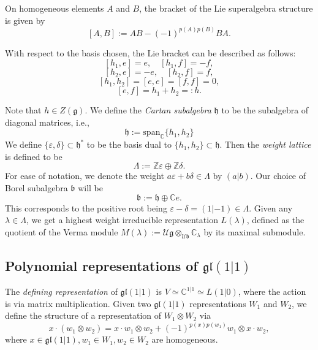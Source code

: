 \documentclass[11pt,a4paper,reqno]{amsart}
\newcommand{\g}{\mathfrak{g}}
\newcommand{\gl}{\mathfrak{gl}}
\newcommand{\e}{\varepsilon}
\newcommand{\C}{\mathbb{C}}
\newcommand{\Z}{\mathbb{Z}}
\renewcommand{\d}{\delta}
\newcommand{\h}{\mathfrak{h}}
\renewcommand{\sl}{\mathfrak{sl}}
\numberwithin{equation}{section}
\theoremstyle{definition}
\theoremstyle{remark}
\begin{document}
On homogeneous elements $A$ and $B$, the bracket of the Lie superalgebra structure is given by
\[[A, B] := AB - (-1)^{p(A)p(B)} BA.\]

With respect to the basis chosen, the Lie bracket can be described as follows:
\[[h_1, e] = e,\quad [h_1, f] = -f,\]
\[[h_2, e] = -e,\quad [h_2, f] = f,\]
\[[h_1, h_2] = [e,e] = [f,f] = 0,\]
\[[e, f] = h_1+h_2 =: h.\]

Note that $h\in Z(\g)$. We define the \emph{Cartan subalgebra} $\h$ to be the subalgebra of diagonal matrices, i.e.,
\[\h := \mathrm{span}_\C\{h_1, h_2\}\]
We define $\{\e,\d\}\subset \h^*$ to be the basis dual to $\{h_1, h_2\}\subset \h$. Then the \emph{weight lattice} is defined to be
\[\Lambda:= \Z\e\oplus \Z \d.\]
For ease of notation, we denote the weight $a\e+b\d\in \Lambda$ by $(a|b)$.
Our choice of Borel subalgebra $\mathfrak b$ will be
\[\mathfrak b := \h \oplus \C e.\]
This corresponds to the positive root being $\e - \d = (1|-1)\in \Lambda$. Given any $\lambda\in \Lambda$, we get a highest weight irreducible representation $L(\lambda)$, defined as the quotient of the Verma module $M(\lambda):=\mathcal {U}\g\otimes_{\mathcal{U}\mathfrak{b}} \C_{\lambda}$ by its maximal submodule.

\subsection{Polynomial representations of \texorpdfstring{$\gl(1|1)$}{gl(1|1)}}

The \emph{defining representation} of $\gl(1|1)$ is $V\simeq \C^{1|1}\simeq L(1|0)$, where the action is via matrix multiplication. Given two $\gl(1|1)$ representations $W_1$ and $W_2$, we define the structure of a representation of $W_1\otimes W_2$ via
\[x\cdot (w_1\otimes w_2) = x\cdot w_1\otimes w_2 + (-1)^{p(x)p(w_1)}w_1\otimes x\cdot w_2,\]
where $x\in \gl(1|1), w_1\in W_1, w_2\in W_2$ are homogeneous.
\end{document}
